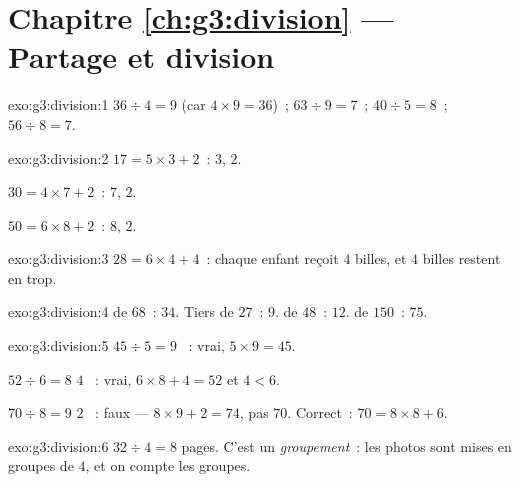 \section*{Chapitre \ref{ch:g3:division} --- Partage et division}

\begin{solution}{exo:g3:division:1}
$36 \div 4 = 9$ (car $4 \times 9 = 36$)~; \quad
$63 \div 9 = 7$~; \quad $40 \div 5 = 8$~; \quad $56 \div 8 = 7$.
\end{solution}

\begin{solution}{exo:g3:division:2}
$17 = 5 \times 3 + 2$~:  $3$,  $2$.

$30 = 4 \times 7 + 2$~:  $7$,  $2$.

$50 = 6 \times 8 + 2$~:  $8$,  $2$.
\end{solution}

\begin{solution}{exo:g3:division:3}
$28 = 6 \times 4 + 4$~: chaque enfant reçoit $4$ billes, et $4$
billes restent en trop.
\end{solution}

\begin{solution}{exo:g3:division:4}
 de $68$~: $34$. Tiers de $27$~: $9$.  de $48$~: $12$.
 de $150$~: $75$.
\end{solution}

\begin{solution}{exo:g3:division:5}
\guillemotleft{} $45 \div 5 = 9$ \guillemotright{}~: vrai,
$5 \times 9 = 45$.

\guillemotleft{} $52 \div 6 = 8$  $4$ \guillemotright{}~: vrai,
$6 \times 8 + 4 = 52$ et $4 < 6$.

\guillemotleft{} $70 \div 8 = 9$  $2$ \guillemotright{}~: faux
--- $8 \times 9 + 2 = 74$, pas $70$. Correct~:
$70 = 8 \times 8 + 6$.
\end{solution}

\begin{solution}{exo:g3:division:6}
$32 \div 4 = 8$ pages. C'est un \emph{groupement}~: les photos sont
mises en groupes de $4$, et on compte les groupes.
\end{solution}

